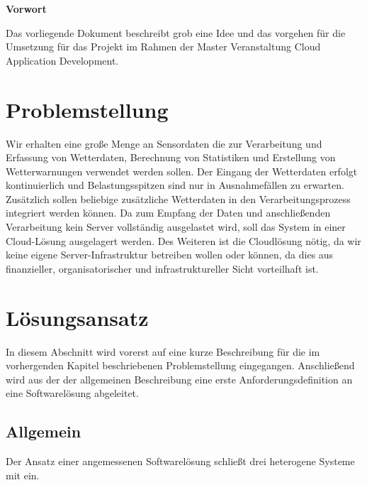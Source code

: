 \documentclass[paper,oneside,onecolumn,notitlepage,bibtotocnumbered,fontsize=12pt,bigheadings,ngerman]{scrartcl}
\newcommand{\sectionnumbering}[1]{%
  \setcounter{section}{0}%
   \renewcommand{\thesection}{\csname #1\endcsname{section}}}
\begin{document}




{\Large \textbf{Vorwort}}
\bigskip

Das vorliegende Dokument beschreibt grob eine Idee und das vorgehen für die Umsetzung für das Projekt im Rahmen der Master Veranstaltung Cloud Application Development.




\normalsize


\setlength{\parindent}{0pt}

\newpage
\sectionnumbering{Roman} 
\tableofcontents
\clearpage

\listoffigures 
\clearpage 

\listoftables 
\clearpage
{} 
\sectionnumbering{arabic} 

\section{Problemstellung}
Wir erhalten eine große Menge an Sensordaten die zur Verarbeitung und Erfassung von Wetterdaten, Berechnung von Statistiken und Erstellung von Wetterwarnungen verwendet werden sollen. Der Eingang der Wetterdaten erfolgt kontinuierlich und Belastungsspitzen sind nur in Ausnahmefällen zu erwarten. Zusätzlich sollen beliebige zusätzliche Wetterdaten in den Verarbeitungsprozess integriert werden können. 
Da zum Empfang der Daten und anschließenden Verarbeitung kein Server vollständig ausgelastet wird, soll das System in einer Cloud-Lösung ausgelagert werden. 
Des Weiteren ist die Cloudlösung nötig, da wir keine eigene Server-Infrastruktur betreiben wollen oder können, da dies aus finanzieller, organisatorischer und infrastruktureller Sicht vorteilhaft ist.

\section{Lösungsansatz}
In diesem Abschnitt wird vorerst auf eine kurze Beschreibung für die im vorhergenden Kapitel beschriebenen Problemstellung eingegangen. Anschließend wird aus der der allgemeinen Beschreibung eine erste Anforderungsdefinition an eine Softwarelösung abgeleitet.
\subsection{Allgemein}
Der Ansatz einer angemessenen Softwarelösung schließt drei heterogene Systeme mit ein. 
\end{document}
